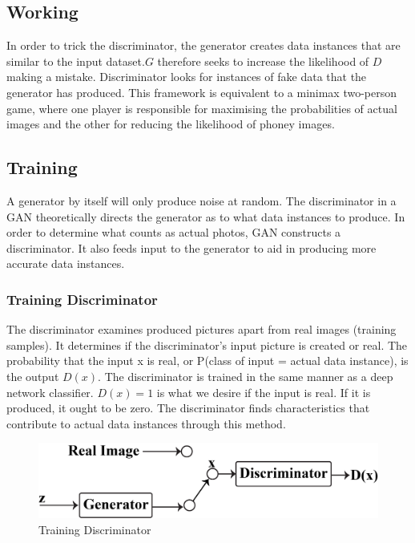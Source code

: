 \documentclass[conference]{IEEEtran}
\begin{document}
\subsection{Working}\label{Working}
In order to trick the discriminator, the generator creates data instances that are similar to the input dataset.$G$ therefore seeks to increase the likelihood of $D$ making a mistake. Discriminator looks for instances of fake data that the generator has produced. This framework is equivalent to a minimax two-person game, where one player is responsible for maximising the probabilities of actual images and the other for reducing the likelihood of phoney images.

\subsection{Training}\label{Training}
A generator by itself will only produce noise at random. The discriminator in a GAN theoretically directs the generator as to what data instances to produce. In order to determine what counts as actual photos, GAN constructs a discriminator. It also feeds input to the generator to aid in producing more accurate data instances.

\subsubsection{Training Discriminator}\label{Training Discriminator}
The discriminator examines produced pictures apart from real images (training samples). It determines if the discriminator's input picture is created or real. The probability that the input x is real, or P(class of input = actual data instance), is the output $D(x)$. The discriminator is trained in the same manner as a deep network classifier. $D(x)=1$ is what we desire if the input is real. If it is produced, it ought to be zero. The discriminator finds characteristics that contribute to actual data instances through this method.

\begin{figure}[h]
\centerline{\includegraphics[width=\linewidth]{Training-Discriminator}}
\caption{Training Discriminator}
\label{fig}
\end{figure}
\end{document}
